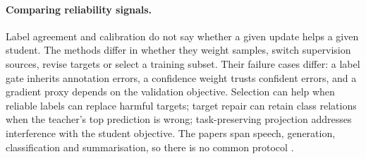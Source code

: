 \paragraph{Comparing reliability signals.} Label agreement and calibration do not say whether a given update helps a given student. The methods differ in whether they weight samples, switch supervision sources, revise targets or select a training subset. Their failure cases differ: a label gate inherits annotation errors, a confidence weight trusts confident errors, and a gradient proxy depends on the validation objective.
Selection can help when reliable labels can replace harmful targets; target repair can retain class relations when the teacher's top prediction is wrong; task-preserving projection addresses interference with the student objective. The papers span speech, generation, classification and summarisation, so there is no common protocol \citep{yuan2026tpkd}.

